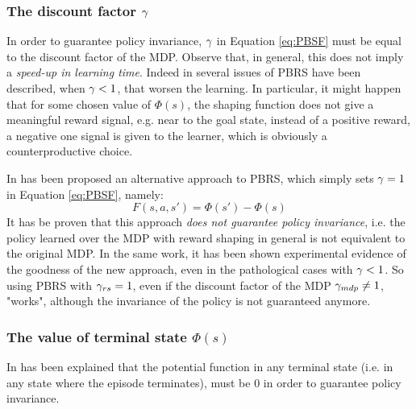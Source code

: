 \subsubsection{The discount factor $\gamma$}
In order to guarantee policy invariance, $\gamma$ in Equation \ref{eq:PBSF} must be equal to the discount factor of the MDP.
Observe that, in general, this does not imply a \emph{speed-up in learning time}. Indeed in \citep{grzes2010improving, 5381523} several issues of PBRS have been described, when $\gamma<1$, that worsen the learning. In particular, it might happen that for some chosen value of $\Phi(s)$, the shaping function does not give a meaningful reward signal, e.g. near to the goal state, instead of a positive reward, a negative one signal is given to the learner, which is obviously a counterproductive choice.

In \citep{grzes2010improving} has been proposed an alternative approach to PBRS, which simply sets $\gamma=1$ in Equation \ref{eq:PBSF}, namely:
\begin{equation}\label{eq:PBRS-no-gamma}
F(s,a,s') = \Phi(s') - \Phi(s)
\end{equation}
It has be proven that this approach \emph{does not guarantee policy invariance}, i.e. the policy learned over the MDP with reward shaping in general is not equivalent to the original MDP. In the same work, it has been shown experimental evidence of the goodness of the new approach, even in the pathological cases with $\gamma<1$. 
So using PBRS with $\gamma_{rs}=1$, even if the discount factor of the MDP $\gamma_{mdp}\neq1$, "works", although the invariance of the policy is not guaranteed anymore.
\subsubsection{The value of terminal state $\Phi(s)$}
In \citep{Grzes:2017:RSE:3091125.3091208} has been explained that the potential function in any terminal state (i.e. in any state where the episode terminates), must be 0 in order to guarantee policy invariance.  

